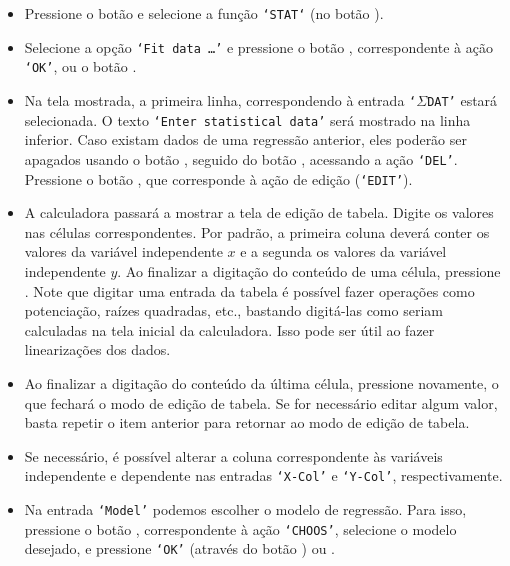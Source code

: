 \begin{itemize}
\item Pressione o botão \keystroke{~$\Rsh$~} e selecione a função \texttt{`STAT`} (no botão ).

\item Selecione a opção \texttt{`Fit data \dots'} e pressione o botão , correspondente à ação \texttt{`OK'}, ou o botão .

\item Na tela mostrada, a primeira linha, correspondendo à entrada \texttt{`}$\Sigma$\texttt{DAT'} estará selecionada. O texto \texttt{`Enter statistical data'} será mostrado na linha inferior. Caso existam dados de uma regressão anterior, eles poderão ser apagados usando o botão \keystroke{~$\Lsh$~}, seguido do botão \keystroke{~$\leftarrow$~}, acessando a ação \texttt{`DEL'}. Pressione o botão , que corresponde à ação de edição (\texttt{`EDIT'}).

\item A calculadora passará a mostrar a tela de edição de tabela. Digite os valores nas células correspondentes. Por padrão, a primeira coluna deverá conter os valores da variável independente $x$ e a segunda os valores da variável independente $y$. Ao finalizar a digitação do conteúdo de uma célula, pressione . Note que digitar uma entrada da tabela é possível fazer operações como potenciação, raízes quadradas, etc., bastando digitá-las como seriam calculadas na tela inicial da calculadora. Isso pode ser útil ao fazer linearizações dos dados.

\item Ao finalizar a digitação do conteúdo da última célula, pressione  novamente, o que fechará o modo de edição de tabela. Se for necessário editar algum valor, basta repetir o item anterior para retornar ao modo de edição de tabela.

\item Se necessário, é possível alterar a coluna correspondente às variáveis independente e dependente nas entradas \texttt{`X-Col'} e \texttt{`Y-Col'}, respectivamente.

\item Na entrada \texttt{`Model'} podemos escolher o modelo de regressão. Para isso, pressione o botão , correspondente à ação \texttt{`CHOOS'}, selecione o modelo desejado, e pressione \texttt{`OK'} (através do botão ) ou .


\end{itemize}
